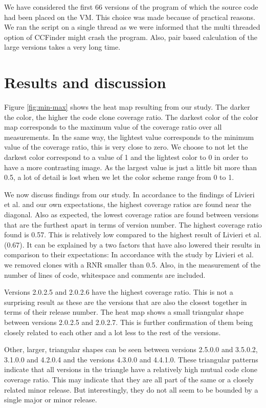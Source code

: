 \documentclass[a4paper,twoside, twocolumn, 11pt]{article}
\numberwithin{equation}{section}
\begin{document}
We have considered the first 66 versions of the program of which the source code had been placed on the VM. 
This choice was made because of practical reasons. 
We ran the script on a single thread as we were informed that the multi threaded option of CCFinder might crash the program. 
Also, pair based calculation of the large versions takes a very long time.

\section{Results and discussion}
Figure \ref{fig:min-max} shows the heat map resulting from our study. 
The darker the color, the higher the code clone coverage ratio. 
The darkest color of the color map corresponds to the maximum value of the coverage ratio over all measurements.
In the same way, the lightest value corresponds to the minimum value of the coverage ratio, this is very close to zero. 
We choose to not let the darkest color correspond to a value of 1 and the lightest color to 0 in order to have a more contrasting image.
As the largest value is just a little bit more than 0.5, a lot of detail is lost when we let the color scheme range from 0 to 1.

We now discuss findings from our study.
In accordance to the findings of Livieri et al. and our own expectations, the highest coverage ratios are found near the diagonal.
Also as expected, the lowest coverage ratios are found between versions that are the furthest apart in terms of version number.
The highest coverage ratio found is 0.57. This is relatively low compared to the highest result of Livieri et al. (0.67).
It can be explained by a two factors that have also lowered their results in comparison to their expectations:
In accordance with the study by Livieri et al. we removed clones with a RNR smaller than 0.5. 
Also, in the measurement of the number of lines of code, whitespace and comments are included.

Versions 2.0.2.5 and 2.0.2.6 have the highest coverage ratio.
This is not a surprising result as these are the versions that are also the closest together in terms of their release number. 
The heat map shows a small triangular shape between versions 2.0.2.5 and 2.0.2.7. 
This is further confirmation of them being closely related to each other and a lot less to the rest of the versions.

Other, larger, triangular shapes can be seen between versions 2.5.0.0 and 3.5.0.2, 3.1.0.0 and 4.2.0.4 and the versions 4.3.0.0 and 4.4.1.0.
These triangular patterns indicate that all versions in the triangle have a relatively high mutual code clone coverage ratio.
This may indicate that they are all part of the same or a closely related minor release.
But interestingly, they do not all seem to be bounded by a single major or minor release.
\end{document}
